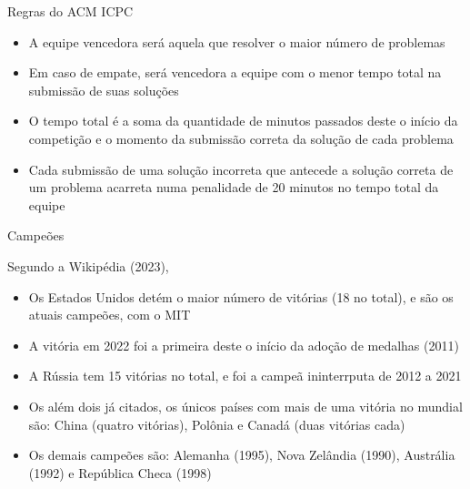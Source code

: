 \begin{frame}[fragile]{Regras do ACM ICPC}

    \begin{itemize}
        \item A equipe vencedora será aquela que resolver o maior número de problemas
        \item Em caso de empate, será vencedora a equipe com o menor tempo total na
        submissão de suas soluções
        \item O tempo total é a soma da quantidade de minutos passados deste o início da
        competição e o momento da submissão correta da solução de cada problema
        \item Cada submissão de uma solução incorreta que antecede a
        solução correta de um problema acarreta numa penalidade de 20 minutos no tempo total da
        equipe
    \end{itemize}

\end{frame}

\begin{frame}[fragile]{Campeões}

    Segundo a Wikipédia (2023),

    \begin{itemize}
        \item Os Estados Unidos detém o maior número de vitórias (18 no total), e são os atuais campeões, com o MIT
        \item A vitória em 2022 foi a primeira deste o início da adoção de medalhas (2011)
        \item A Rússia tem 15 vitórias no total, e foi a campeã ininterrputa de 2012 a 2021 
        \item Os além dois já citados, os únicos países com mais de uma vitória no mundial são:
            China (quatro vitórias), Polônia e Canadá (duas vitórias cada)
        \item Os demais campeões são: Alemanha (1995), Nova Zelândia (1990), Austrália (1992)  e
            República Checa (1998)
    \end{itemize}

\end{frame}

